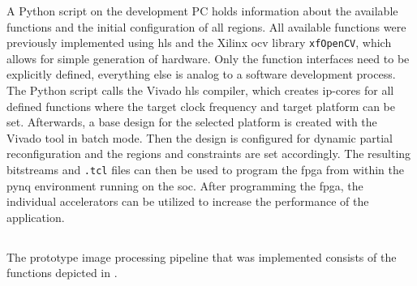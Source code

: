 \documentclass{scrartcl}
\begin{document}
A Python script on the development PC holds information about the available
functions and the initial configuration of all regions. All available functions
were previously implemented using \gls{hls} and the Xilinx \gls{ocv} library
\texttt{xfOpenCV}, which allows for simple generation of hardware. Only the
function interfaces need to be explicitly defined, everything else is analog to
a software development process. The Python script calls the Vivado \gls{hls}
compiler, which creates \gls{ip}-cores for all defined functions where the
target clock frequency and target platform can be set. Afterwards, a base design
for the selected platform is created with the Vivado tool in batch mode. Then
the design is configured for dynamic partial reconfiguration and the regions and
constraints are set accordingly. The resulting bitstreams and \texttt{.tcl}
files can then be used to program the \gls{fpga} from within the \gls{pynq}
environment running on the \gls{soc}. After programming the \gls{fpga}, the
individual accelerators can be utilized to increase the performance of the
application.


\subsection{}

The prototype image processing pipeline that was implemented consists of the
functions depicted in .
\end{document}
